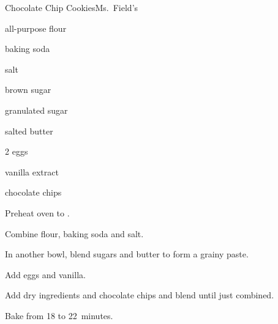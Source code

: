 \begin{recipe}{Chocolate Chip Cookies}{Ms.~Field's}{}

\begin{ingredients}
\item \C{2 \half} all-purpose flour
\item \tp{\half} baking soda
\item \tp{\quarter} salt
\item {} brown sugar
\item \C{\half} granulated sugar
\item {} salted butter
\item 2 eggs
\item {} vanilla extract
\item {} chocolate chips
\end{ingredients}

\begin{directions}
\item Preheat oven to .
\item Combine flour, baking soda and salt.
\item In another bowl, blend sugars and butter to form a grainy paste.
\item Add eggs and vanilla.
\item Add dry ingredients and chocolate chips and blend until just combined.
\item Bake from 18 to 22~minutes.
\end{directions}
\end{recipe}

